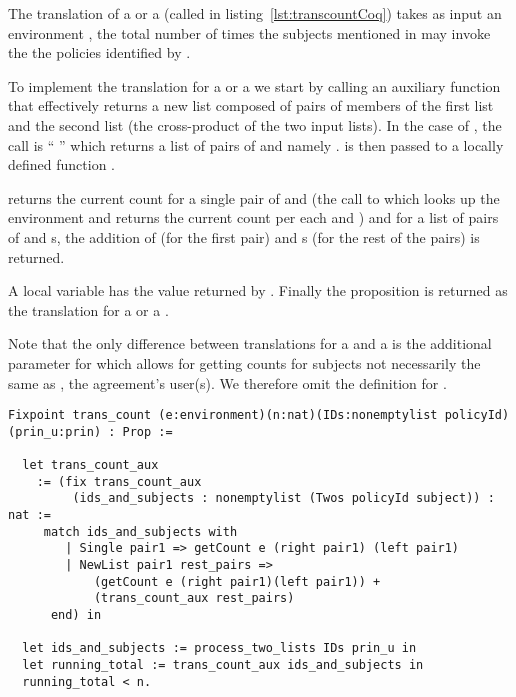 The translation of a  or a  (called  in listing~\ref{lst:transcountCoq}) takes as input an environment ,  the total number of times the subjects mentioned in  may invoke the 
the policies identified by .

To implement the translation for a  or a  we start by calling an auxiliary function  that effectively returns a new list composed of pairs of members of the first list and the second list (the cross-product of the two input lists). In the case of , the call is ``  '' which returns a list of pairs of  and  namely .  is then passed to a locally defined function .

 returns the current count for a single pair of  and  (the call to  which looks up the environment  and returns the current count per each  and ) and for a list of pairs of  and s, the addition of  (for the first pair) and s (for the rest of the pairs) is returned. 

A local variable  has the value returned by . Finally the proposition  is returned as the translation for a  or a .

Note that the only difference between translations for a  and a  is the additional  parameter for  which allows for getting counts for subjects not necessarily the same as , the agreement's user(s). We therefore omit the definition for .


\begin{minipage}[c]{0.95\textwidth}
\begin{lstlisting}
Fixpoint trans_count (e:environment)(n:nat)(IDs:nonemptylist policyId)(prin_u:prin) : Prop :=

  let trans_count_aux 
    := (fix trans_count_aux
         (ids_and_subjects : nonemptylist (Twos policyId subject)) : nat :=
     match ids_and_subjects with
        | Single pair1 => getCount e (right pair1) (left pair1)
        | NewList pair1 rest_pairs =>
            (getCount e (right pair1)(left pair1)) +
            (trans_count_aux rest_pairs)
      end) in
  
  let ids_and_subjects := process_two_lists IDs prin_u in
  let running_total := trans_count_aux ids_and_subjects in
  running_total < n.
\end{lstlisting}
\end{minipage}

